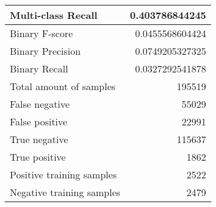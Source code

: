 \begin{table}[H]
\begin{minipage}{0.5\textwidth}
\begin{tabular}{l r}
Multi-class Recall & 0.403786844245 \\
\midrule
Binary F-score & 0.0455568604424 \\
Binary Precision & 0.0749205327325 \\
Binary Recall & 0.0327292541878 \\
\midrule
Total amount of samples & 195519 \\
False negative & 55029 \\
False positive & 22991 \\
True negative & 115637 \\
True positive & 1862 \\
\midrule
Positive training samples & 2522 \\
Negative training samples & 2479 \\
\bottomrule
\end{tabular}
\end{minipage}
\end{table}
